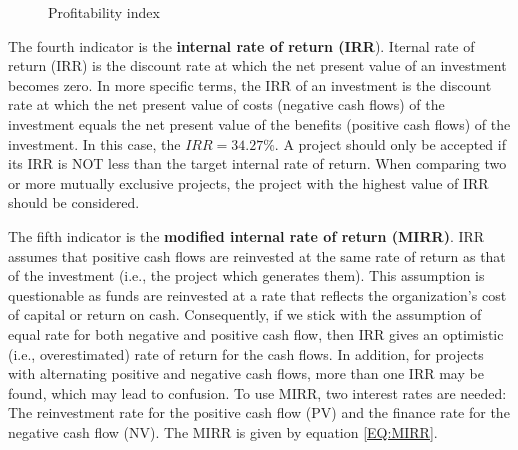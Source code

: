 \begin{enumerate}[label=\textbf{Step \arabic{enumi}}:,ref=Step \arabic{enumi}]
	\begin{figure}[h!]
		\centering
		\caption{Profitability index}
		\label{fig:PI}
	\end{figure}

	The fourth indicator is the \textbf{internal rate of return (IRR}). Iternal rate of return (IRR) is the discount rate at which the net present value of an investment becomes zero. In more specific terms, the IRR of an investment is the discount rate at	which the net present value of costs (negative cash flows) of the investment equals the net present value of the benefits (positive cash flows) of the investment. In this case, the $IRR = 34.27\%$. A project should only be accepted if its IRR is NOT less than the target internal rate of return. When comparing two or more mutually exclusive projects, the project with the highest value of IRR should be considered.
	
	The fifth indicator is the \textbf{modified internal rate of return (MIRR)}. IRR assumes that positive cash flows are reinvested at the same rate of return as that of the investment (i.e., the project which generates them). This assumption is questionable as funds are reinvested at a rate that reflects the organization’s cost of capital or return on cash. Consequently, if we stick with the assumption of equal rate for both negative and positive cash flow, then IRR gives an optimistic (i.e., overestimated) rate of return for the cash flows. In addition, for projects with alternating positive and negative cash flows, more than one IRR may be found, which may lead to confusion. To use MIRR, two interest rates are needed: The reinvestment rate for the positive cash flow (PV) and the finance rate for the negative cash flow (NV). The MIRR is given by equation \ref{EQ:MIRR}.
	

\end{enumerate}
